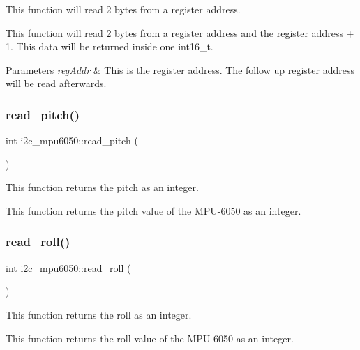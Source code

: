 This function will read 2 bytes from a register address. 

This function will read 2 bytes from a register address and the register address + 1. This data will be returned inside one int16\+\_\+t. 
\begin{DoxyParams}{Parameters}
{\em reg\+Addr} & This is the register address. The follow up register address will be read afterwards. \\
\hline
\end{DoxyParams}
\mbox{\label{classi2c__mpu6050_a5337dde97dfb9e5c1f7025ff338fa5d3}} 
\subsubsection{\texorpdfstring{read\+\_\+pitch()}{read\_pitch()}}
{\footnotesize\ttfamily int i2c\+\_\+mpu6050\+::read\+\_\+pitch (\begin{DoxyParamCaption}{ }\end{DoxyParamCaption})}



This function returns the pitch as an integer. 

This function returns the pitch value of the M\+P\+U-\/6050 as an integer. \mbox{\label{classi2c__mpu6050_a0ebe5455574a34f7c0355c96f9c30e9c}} 
\subsubsection{\texorpdfstring{read\+\_\+roll()}{read\_roll()}}
{\footnotesize\ttfamily int i2c\+\_\+mpu6050\+::read\+\_\+roll (\begin{DoxyParamCaption}{ }\end{DoxyParamCaption})}



This function returns the roll as an integer. 

This function returns the roll value of the M\+P\+U-\/6050 as an integer. \mbox{\label{classi2c__mpu6050_afd391b5f5322088d6831a05deaa6c4dd}} 
